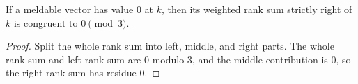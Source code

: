 \begin{lemma}

  \label{lem:meldable_right_rank_mod_zero}
  If a meldable vector has value \(0\) at \(k\), then its weighted rank
  sum strictly right of \(k\) is congruent to \(0\pmod3\).
\end{lemma}
\begin{proof}

\leanok
  Split the whole rank sum into left, middle, and right parts.  The whole
  rank sum and left rank sum are \(0\) modulo \(3\), and the middle
  contribution is \(0\), so the right rank sum has residue \(0\).
\end{proof}


